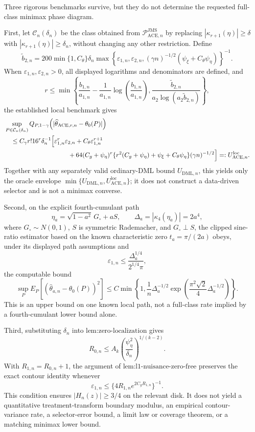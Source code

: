 Three rigorous benchmarks survive, but they do not determine the requested full-class minimax phase diagram.

First, let \(\mathcal C_n(\delta_n)\) be the class obtained from \(\mathcal P_{\mathrm{ACE},n}^{\mathrm{JMS}}\) by replacing \(|\kappa_{r+1}(\eta)|\ge\delta\) with \(|\kappa_{r+1}(\eta)|\ge\delta_n\), without changing any other restriction.  Define
\[
 \widetilde b_{2,n}
 =200\min\{1,C_{\theta}\}\delta_n
 \max\!\left\{
   \varepsilon_{1,n},\varepsilon_{2,n},
   (\gamma n)^{-1/2}(\psi_{\xi}+C_{\theta}\psi_{\eta})
 \right\}^{-1}.
\]
When \(\varepsilon_{1,n},\varepsilon_{2,n}>0\), all displayed logarithms and denominators are defined, and
\[
 r\le
 \min\!\left\{
   \frac{b_{1,n}}{a_{1,n}}
   -\frac{1}{a_{1,n}}\log\!\left(\frac{b_{1,n}}{a_{1,n}}\right),
   \frac{\widetilde b_{2,n}}{a_2\log(a_2\widetilde b_{2,n})}
 \right\},
\]
the established local benchmark gives
\[
\begin{aligned}
 &\sup_{P\in\mathcal C_n(\delta_n)}
 Q_{P,1-\gamma}
 \!\left(|\widehat\theta_{\mathrm{ACE},r,n}-\theta_0(P)|\right)\\
 &\quad\le
 C_{\gamma}r!16^r\delta_n^{-1}
 \Bigl[
   \varepsilon_{1,n}^r\varepsilon_{2,n}
   +C_{\theta}\varepsilon_{1,n}^{r+1}\\
 &\hspace{35mm}
   +64(C_g+\psi_{\eta})^r
    \{r^2(C_g+\psi_{\eta})+\psi_{\xi}+C_{\theta}\psi_{\eta}\}
    (\gamma n)^{-1/2}
 \Bigr]
 =:U_{\mathrm{ACE},n}^{\mathrm{loc}}.
\end{aligned}
\]
Together with any separately valid ordinary-DML bound \(U_{\mathrm{DML},n}\), this yields only the oracle envelope \(\min\{U_{\mathrm{DML},n},U_{\mathrm{ACE},n}^{\mathrm{loc}}\}\); it does not construct a data-driven selector and is not a minimax converse.

Second, on the explicit fourth-cumulant path
\[
 \eta_a=\sqrt{1-a^2}\,G_{\circ}+aS,
 \qquad
 \Delta_a=|\kappa_4(\eta_a)|=2a^4,
\]
where \(G_{\circ}\sim N(0,1)\), \(S\) is symmetric Rademacher, and \(G_{\circ}\perp S\), the clipped sine-ratio estimator based on the known characteristic zero \(t_a=\pi/(2a)\) obeys, under its displayed path assumptions and
\[
 \varepsilon_{1,n}\le\frac{\Delta_a^{1/4}}{2^{1/4}\pi},
\]
the computable bound
\[
 \sup_P E_P[(\widehat\theta_{a,n}-\theta_0(P))^2]
 \le
 C\min\!\left\{
  1,\frac{1}{n}\Delta_a^{-1/2}
  \exp\!\left(\frac{\pi^2\sqrt2}{4}\Delta_a^{-1/2}\right)
 \right\}.
\]
This is an upper bound on one known local path, not a full-class rate implied by a fourth-cumulant lower bound alone.

Third, substituting \(\delta_n\) into \(\text{lem:zero-localization}\) gives
\[
 R_{0,n}\le A_k
 \left(\frac{\psi_{\eta}^2}{\delta_n}\right)^{1/(k-2)}.
\]
With \(R_{1,n}=R_{0,n}+1\), the argument of \(\text{lem:l1-nuisance-zero-free}\) preserves the exact contour identity whenever
\[
 \varepsilon_{1,n}
 \le\{4R_{1,n}e^{2C_gR_{1,n}}\}^{-1}.
\]
This condition ensures \(|H_n(z)|\ge3/4\) on the relevant disk.  It does not yield a quantitative treatment-transform boundary modulus, an empirical contour-variance rate, a selector-error bound, a limit law or coverage theorem, or a matching minimax lower bound.